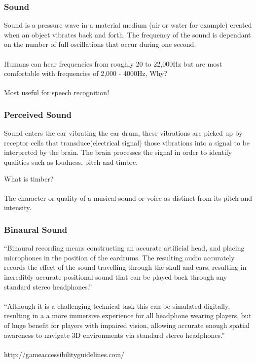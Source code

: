 \begin{frame}
	\frametitle{Sound}
	
	Sound is a pressure wave in a material medium (air or water for example) created when an object vibrates back and forth. The frequency of the sound is dependant on the number of full oscillations that occur during one second. 
	\\~\\
	Humans can hear frequencies from roughly 20 to 22,000Hz but are most comfortable with frequencies of 2,000 - 4000Hz, Why? \pause
	\\~\\
	Most useful for speech recognition!

\end{frame}

\begin{frame}
	\frametitle{Perceived Sound}
	Sound enters the ear vibrating the ear drum, these vibrations are picked up by receptor cells that transduce(electrical signal) those vibrations into a signal to be interpreted by the brain. The brain processes the signal in order to identify qualities such as loudness, pitch and timbre. 
	
	What is timber? \\~\\ \pause
	The character or quality of a musical sound or voice as distinct from its pitch and intensity.

\end{frame}


\begin{frame}
	\frametitle{Binaural Sound}
	``Binaural recording means constructing an accurate artificial head, and placing microphones in the position of the eardrums. The resulting audio accurately records the effect of the sound travelling through the skull and ears, resulting in incredibly accurate positional sound that can be played back through any standard stereo headphones.''
	\\~\\
``Although it is a challenging technical task this can be simulated digitally, resulting in a a more immersive experience for all headphone wearing players, but of huge benefit for players with impaired vision, allowing accurate enough spatial awareness to navigate 3D environments via standard stereo headphones.'' \\~\\
	\tiny{http://gameaccessibilityguidelines.com/}
\end{frame}

